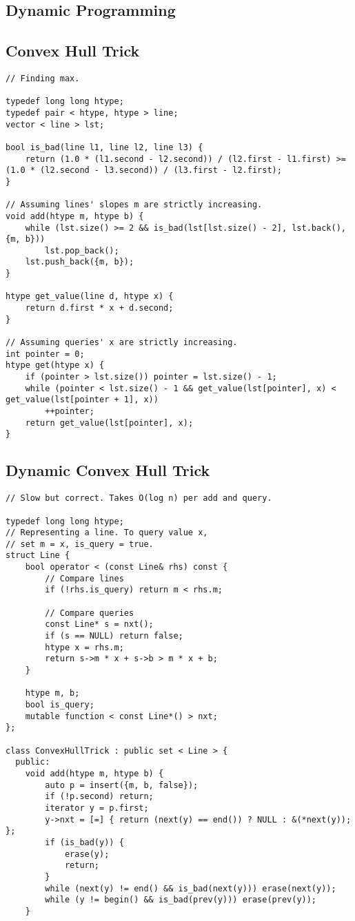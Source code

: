 \documentclass[10pt,landscape]{article}
\begin{document}
\begin{multicols}{2}
\section{Dynamic Programming}
\subsection{Convex Hull Trick}
\begin{lstlisting}
// Finding max.

typedef long long htype;
typedef pair < htype, htype > line;
vector < line > lst;

bool is_bad(line l1, line l2, line l3) {
    return (1.0 * (l1.second - l2.second)) / (l2.first - l1.first) >= (1.0 * (l2.second - l3.second)) / (l3.first - l2.first);
}

// Assuming lines' slopes m are strictly increasing.
void add(htype m, htype b) {
    while (lst.size() >= 2 && is_bad(lst[lst.size() - 2], lst.back(), {m, b}))
        lst.pop_back();
    lst.push_back({m, b});
}

htype get_value(line d, htype x) {
    return d.first * x + d.second;
}

// Assuming queries' x are strictly increasing.
int pointer = 0;
htype get(htype x) {
    if (pointer > lst.size()) pointer = lst.size() - 1;
    while (pointer < lst.size() - 1 && get_value(lst[pointer], x) < get_value(lst[pointer + 1], x))
        ++pointer;
    return get_value(lst[pointer], x);
}
\end{lstlisting}
\subsection{Dynamic Convex Hull Trick}
\begin{lstlisting}
// Slow but correct. Takes O(log n) per add and query.

typedef long long htype;
// Representing a line. To query value x,
// set m = x, is_query = true.
struct Line {
    bool operator < (const Line& rhs) const {
        // Compare lines
        if (!rhs.is_query) return m < rhs.m;

        // Compare queries
        const Line* s = nxt();
        if (s == NULL) return false;
        htype x = rhs.m;
        return s->m * x + s->b > m * x + b;
    }

    htype m, b;
    bool is_query;
    mutable function < const Line*() > nxt;
};

class ConvexHullTrick : public set < Line > {
  public:
    void add(htype m, htype b) {
        auto p = insert({m, b, false});
        if (!p.second) return;
        iterator y = p.first;
        y->nxt = [=] { return (next(y) == end()) ? NULL : &(*next(y)); };
        if (is_bad(y)) {
            erase(y);
            return;
        }
        while (next(y) != end() && is_bad(next(y))) erase(next(y));
        while (y != begin() && is_bad(prev(y))) erase(prev(y));
    }


\end{lstlisting}
\end{multicols}
\end{document}
